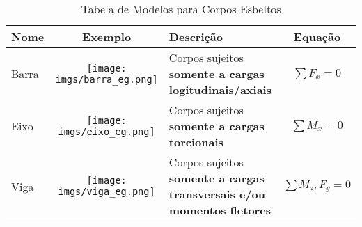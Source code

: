 \documentclass{article}
\begin{document}
            \begin{table}[h]
                \centering
                \begin{tabular}{|l|c|l|c|}\hline
                    \textbf{Nome} & \textbf{Exemplo} & \textbf{Descrição} & \textbf{Equação} \\ \hline
                    Barra
                        &
                        \begin{minipage}{.4\textwidth}
                            \texttt{[image: imgs/barra\_eg.png]}
                        \end{minipage}
                        &
                        \begin{minipage}{.3\textwidth}
                            Corpos sujeitos \textbf{somente a cargas logitudinais/axiais}
                        \end{minipage}
                        &
                        $\sum F_x = 0$ \\ \hline

                    Eixo 
                        &
                        \begin{minipage}{.4\textwidth}
                            \vspace{10px}
                            \texttt{[image: imgs/eixo\_eg.png]}
                        \end{minipage}
                        &
                        \begin{minipage}{.3\textwidth}
                            Corpos sujeitos \textbf{somente a cargas torcionais}
                        \end{minipage}
                        &
                        $\sum M_x = 0$ \\ \hline
                    Viga 
                        &
                        \begin{minipage}{.4\textwidth}
                            \vspace{10px}
                            \texttt{[image: imgs/viga\_eg.png]}
                        \end{minipage}
                        &
                        \begin{minipage}{.3\textwidth}
                            Corpos sujeitos \textbf{somente a cargas transversais e/ou momentos fletores}
                        \end{minipage}
                        &
                        $\sum M_z,F_y = 0$ \\ \hline

                \end{tabular}
                \caption{Tabela de Modelos para Corpos Esbeltos}
            \end{table}
\end{document}
